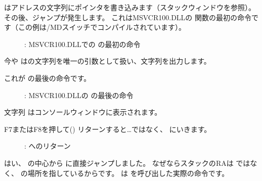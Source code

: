 \clearpage
\MOV はアドレスの文字列にポインタを書き込みます（スタックウィンドウを参照）。
その後、ジャンプが発生します。
これはMSVCR100.DLLの \printf 関数の最初の命令です（この例は/MDスイッチでコンパイルされています）。

\begin{figure}[H]
\centering
{}
\caption{\olly: MSVCR100.DLLでの \printf の最初の命令}
\label{fig:switch_few_olly6}
\end{figure}

今や \printf はの文字列を唯一の引数として扱い、文字列を出力します。

\clearpage
これが \printf の最後の命令です。

\begin{figure}[H]
\centering
{}
\caption{\olly: MSVCR100.DLLの \printf の最後の命令}
\label{fig:switch_few_olly7}
\end{figure}

文字列  はコンソールウィンドウに表示されます。

\clearpage
F7またはF8を押して(\stepover) リターンすると\dots \ttf ではなく、 \main にいきます。

\begin{figure}[H]
\centering
{}
\caption{\olly: \main へのリターン}
\label{fig:switch_few_olly8}
\end{figure}

はい、 \printf の中心から \main に直接ジャンプしました。
なぜならスタックの\ac{RA}は \ttf ではなく、 \main の場所を指しているからです。
\CALL {}は \ttf を呼び出した実際の命令です。
